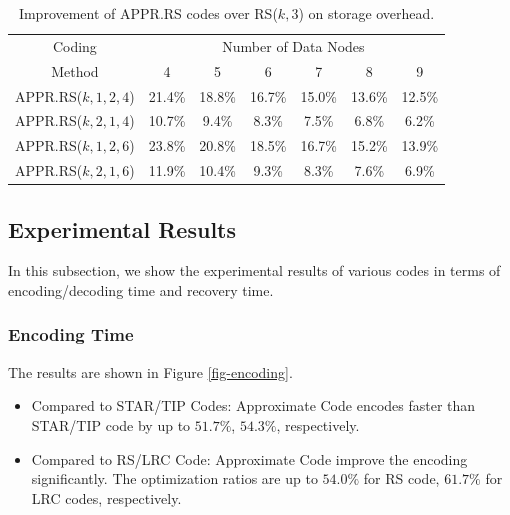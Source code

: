 \documentclass[sigconf]{acmart}
\begin{document}
\begin{table}[]\footnotesize
\caption{Improvement of APPR.RS codes over RS($k,3$) on storage overhead.}\label{tab-SO}
\begin{tabular}{|c|c|c|c|c|c|c|}
\hline
Coding & \multicolumn{6}{c|}{Number of Data Nodes} \\ \cline{2-7} 
Method & 4 & 5 & 6 & 7 & 8 & 9 \\ \hline
APPR.RS($k,1,2,4$) & 21.4\% & 18.8\% & 16.7\% & 15.0\% & 13.6\% & 12.5\% \\ \hline
APPR.RS($k,2,1,4$) & 10.7\% & 9.4\% & 8.3\% & 7.5\% & 6.8\% & 6.2\% \\ \hline
APPR.RS($k,1,2,6$) & 23.8\% & 20.8\% & 18.5\% & 16.7\% & 15.2\% & 13.9\% \\ \hline
APPR.RS($k,2,1,6$) & 11.9\% & 10.4\% & 9.3\% & 8.3\% & 7.6\% & 6.9\% \\ \hline
\end{tabular}
\end{table}

\subsection{Experimental Results}
In this subsection, we show the experimental results of various codes in terms of encoding/decoding time and recovery time.

\subsubsection{Encoding Time}
The results are shown in Figure \ref{fig-encoding}.
\begin{itemize}
    \item Compared to STAR/TIP Codes: Approximate Code encodes faster than STAR/TIP code by up to $51.7\%$, $54.3\%$, respectively. 
    \item Compared to RS/LRC Code: Approximate Code improve the encoding significantly. The optimization ratios are up to $54.0\%$ for RS code,  $61.7\%$ for LRC codes, respectively.
\end{itemize}
\end{document}
